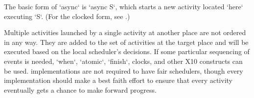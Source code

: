 

The basic form of \xcd`async` is \xcd`async S`, which starts a new activity
located \xcd`here` executing \xcd`S`.   (For the clocked form, see
.)  



Multiple activities launched by a single activity at another place are not
ordered in any way. They are added to the set of activities at the target
place and will be executed based on the local scheduler's decisions.
If some particular sequencing of events is needed, \xcd`when`, \xcd`atomic`,
\xcd`finish`, clocks, and other X10 constructs can be used.
\Xten{} implementations are not required to have fair schedulers,
though every implementation should make a best faith effort to ensure
that every activity eventually gets a chance to make forward progress.

